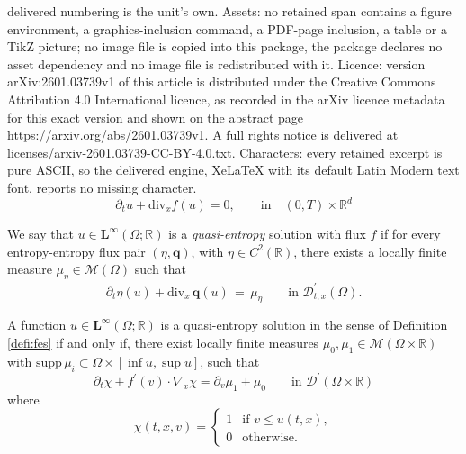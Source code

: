 \documentclass[10pt,a4paper]{amsart}
\newcommand{\bs}[1]{\boldsymbol{#1}}
\newcommand{\mr}[1]{\mathrm{#1}}
\newcommand{\msc}[1]{\mathscr{#1}}
\begin{document}
delivered numbering is the unit's own. Assets: no retained span contains a figure environment, a graphics-inclusion command, a PDF-page inclusion, a table or a TikZ picture; no image file is copied into this package, the package declares no asset dependency and no image file is redistributed with it. Licence: version arXiv:2601.03739v1 of this article is distributed under the Creative Commons Attribution 4.0 International licence, as recorded in the arXiv licence metadata for this exact version and shown on the abstract page https://arxiv.org/abs/2601.03739v1. A full rights notice is delivered at licenses/arxiv-2601.03739-CC-BY-4.0.txt. Characters: every retained excerpt is pure ASCII, so the delivered engine, XeLaTeX with its default Latin Modern text font, reports no missing character.
\begin{equation}\label{eq:conslaw}
    \partial_ t u + \mr{div}_x f(u) = 0,  \qquad \text{in} \quad (0, T) \times \mathbb R^d
\end{equation}

\begin{defi}\label{defi:fes}
    We say that $u \in \mathbf L^\infty(\Omega; \mathbb R)$ is a \textit{quasi-entropy} solution with flux $f$ if for every entropy-entropy flux pair $(\eta, \bs q)$, with $\eta \in C^2(\mathbb R)$, there exists a locally finite measure $\mu_{\eta} \in \msc M(\Omega)$ such that 
    \begin{equation}\label{eq:fenergy}
        \partial_t \eta(u) + \mr{div}_x \, \bs q(u) \, = \, \mu_{\eta} \qquad \text{in $\msc D^\prime_{t,x}(\Omega)$}.
    \end{equation}
\end{defi}

\begin{prop}\label{prop:feskin}
    A function $u \in \mathbf L^\infty(\Omega; \mathbb R)$ is a quasi-entropy solution in the sense of Definition \ref{defi:fes} if and only if, 
there exist locally finite measures $\mu_0, \mu_1 \in \msc M(\Omega \times \mathbb R)$ with $\mr{supp}\, \mu_i \subset \Omega \times [\inf u, \sup u]$, such that 
\begin{equation}\label{eq:kinu}
    \partial_t \chi + f^\prime(v) \cdot \nabla_x \chi = \partial_v \mu_1 + \mu_0 \qquad \text{in $\msc D^\prime(\Omega \times \mathbb R)$}
\end{equation}
where 
\begin{equation}\label{eq:chidef}
\chi(t, x, v) = \begin{cases}
    1 & \text{if $v \leq u(t,x)$},\\
    0 & \text{otherwise}.
\end{cases}
\end{equation}
\end{prop}
\end{document}
